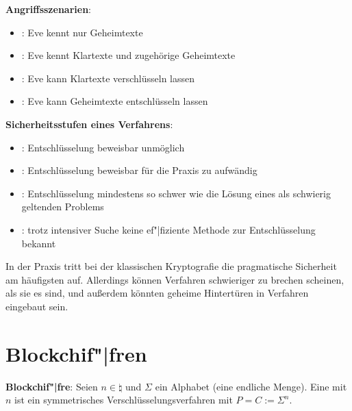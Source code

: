 \linie

\textbf{Angriffsszenarien}:
\begin{itemize}
    \item
    :
    Eve kennt nur Geheimtexte

    \item
    :
    Eve kennt Klartexte und zugehörige Geheimtexte

    \item
    :
    Eve kann Klartexte verschlüsseln lassen

    \item
    :
    Eve kann Geheimtexte entschlüsseln lassen
\end{itemize}

\linie

\textbf{Sicherheitsstufen eines Verfahrens}:
\begin{itemize}
    \item
    :
    Entschlüsselung beweisbar unmöglich

    \item
    :
    Entschlüsselung beweisbar für die Praxis zu aufwändig

    \item
    :
    Entschlüsselung mindestens so schwer wie die Lösung eines als schwierig geltenden Problems

    \item
    :
    trotz intensiver Suche keine ef"|fiziente Methode zur Entschlüsselung bekannt
\end{itemize}
In der Praxis tritt bei der klassischen Kryptografie die pragmatische Sicherheit am häufigsten auf.
Allerdings können Verfahren schwieriger zu brechen scheinen, als sie es sind, und
außerdem könnten geheime Hintertüren in Verfahren eingebaut sein.

\pagebreak

\section{%
    Blockchif"|fren%
}

\textbf{Blockchif"|fre}:
Seien $n \in \natural$ und $\Sigma$ ein Alphabet (eine endliche Menge).
Eine  mit  $n$
ist ein symmetrisches Verschlüsselungsverfahren mit $P = C := \Sigma^n$.

